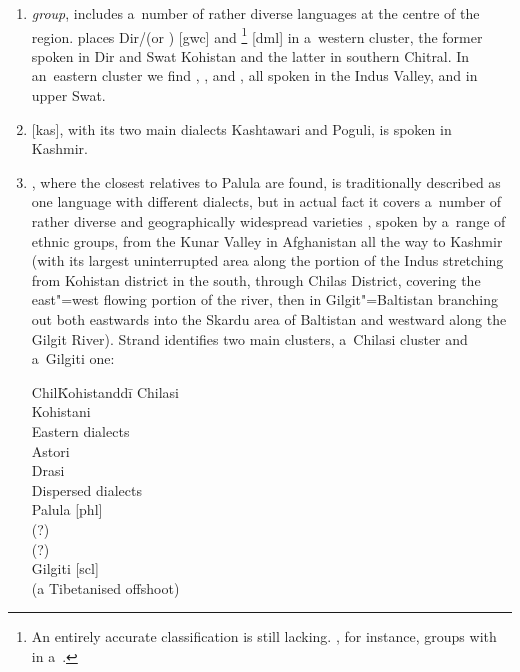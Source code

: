 \begin{enumerate}
\item \textit{\iliKohistani group}, includes a~number of rather diverse languages at the centre of the \iliHKIA region. \citet[258]{strand2001} places Dir/\iliKalamKohistani (or \iliGawri) [gwc] and \iliDameli\footnote{An entirely accurate classification is still lacking. \citet[824]{bashir2003}, for instance, groups \iliDameli with \iliGawarbati in a~\iliKunargroup.} [dml] in a~western cluster, the former spoken in Dir and Swat Kohistan and the latter in southern Chitral. In an~eastern cluster we find \iliIndusKohistani [mvy], \iliGowro [gwf], \iliChilisso [clh] and \iliBateri [btv], all spoken in the Indus Valley, and \iliTorwali [trw] in upper Swat.


\item \textit{\iliKashmiri} [kas], with its two main dialects Kashtawari and Poguli, is spoken in Kashmir. 


\item \textit{\iliShina}, where the closest relatives to Palula are found, is traditionally described as one language with different dialects, but in actual fact it covers a~number of rather diverse and geographically widespread varieties \citep[17]{schmidt1985}, spoken by a~range of ethnic groups, from the Kunar Valley in Afghanistan all the way to Kashmir (with its largest uninterrupted area along the portion of the Indus stretching from Kohistan district in the south, through Chilas District, covering the east"=west flowing portion of the river, then in Gilgit"=Baltistan branching out both eastwards into the Skardu area of Baltistan and westward along the Gilgit River). Strand identifies two main clusters, a~Chilasi cluster and a~Gilgiti one:

\begin{tabbing}
Chil\=Kohistanddi\=\kill
Chilasi \\
\>Kohistani \iliShina [plk] \\
\>Eastern dialects \\
\>\>Astori \\
\>\>Drasi \\
\>Dispersed dialects \\
\>\>Palula [phl] \\
\>\>\iliUshojo [ush] (?) \\
\>\>\iliKalkoti [xka] (?) \\
Gilgiti [scl] \\
\>\iliBrokskat [bkk] (a Tibetanised offshoot) \\
\end{tabbing}
\end{enumerate}

